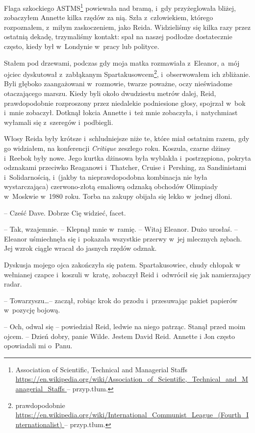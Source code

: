 \documentclass[oneside,polish,11pt,sfheadings]{mwbk}
\begin{document}
Flaga szkockiego ASTMS\footnote{Association of Scientific, Technical and
Managerial Staffs
\url{https://en.wikipedia.org/wiki/Association_of_Scientific,_Technical_and_Managerial_Staffs
} -- przyp.tłum.} powiewała nad bramą, i~gdy przyżeglowała bliżej,
zobaczyłem Annette kilka rzędów za nią. Szła z~człowiekiem, którego
rozpoznałem, z~miłym zaskoczeniem, jako Reida. Widzieliśmy się kilka
razy przez ostatnią dekadę, trzymaliśmy kontakt: spał na naszej podłodze
dostatecznie często, kiedy był w~Londynie w~pracy lub polityce.

Stałem pod drzewami, podczas gdy moja matka rozmawiała z~Eleanor, a~mój
ojciec dyskutował z~zabłąkanym Spartakusowcem\footnote{ prawdopodobnie
\url{https://en.wikipedia.org/wiki/International_Communist_League_(Fourth_Internationalist)
} -- przyp.tłum.}, i~obserwowałem ich
zbliżanie.  Byli głęboko zaangażowani w~rozmowie, twarze poważne,
oczy nieświadome otaczającego marszu. Kiedy byli około dwudziestu metrów
dalej, Reid, prawdopodobnie rozproszony przez niedalekie podniesione
głosy, spojrzał w~bok i~mnie zobaczył. Dotknął łokcia Annette i~też mnie
zobaczyła, i~natychmiast wyłamali się z~szeregów i~podbiegli.

Włosy Reida były krótsze i~schludniejsze niże te, które miał ostatnim
razem, gdy go widziałem, na konferencji \emph{Critique} zeszłego roku.
Koszula, czarne dżinsy i~Reebok były nowe. Jego kurtka dżinsowa była
wyblakła i~postrzępiona, pokryta odznakami przeciwko Reaganowi i~Thatcher, Cruise i~Pershing, za Sandinistami i~Solidarnością, i~(jakby
ta nieprawdopodobna kombinacja nie była wystarczająca) czerwono-złotą
emaliową odznaką obchodów Olimpiady w~Moskwie w~1980 roku. Torba na
zakupy obijała się lekko w~jednej dłoni.

-- Cześć Dave. Dobrze Cię widzieć, facet.

-- Tak, wzajemnie. -- Klepnął mnie w~ramię. -- Witaj Eleanor. Dużo urosłaś.
-- Eleanor uśmiechnęła się i~pokazała wszystkie przerwy w~jej mlecznych
zębach. Jej wzrok ciągle wracał do jasnych rzędów odznak.

Dyskusja mojego ojca zakończyła się patem. Spartakusowiec, chudy chłopak
w wełnianej czapce i~koszuli w~kratę, zobaczył Reid i~odwrócił się jak
namierzający radar.

-- Towarzyszu\ldots -- zaczął, robiąc krok do przodu i~przesuwając pakiet
papierów w~pozycję bojową.

-- Och, odwal się -- powiedział Reid, ledwie na niego patrząc. Stanął
przed moim ojcem. -- Dzień dobry, panie Wilde. Jestem David Reid. Annette
i Jon często opowiadali mi o~Panu.
\end{document}
